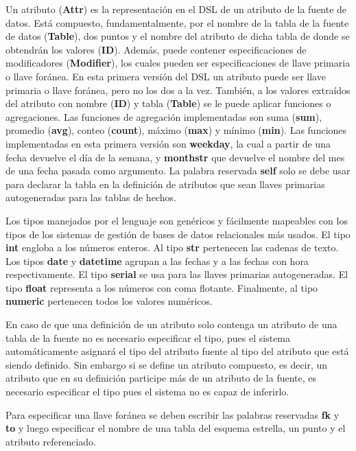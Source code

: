 Un atributo (\textbf{Attr}) es la representación en el DSL de un atributo de la fuente de datos. Est\'a compuesto, 
fundamentalmente, 
por el nombre de la tabla de la fuente de datos (\textbf{Table}), dos puntos y el nombre del atributo de dicha tabla 
de donde se obtendrán los valores (\textbf{ID}). Además, puede contener especificaciones de modificadores (\textbf{Modifier}), 
los cuales pueden ser especificaciones de llave primaria o llave for\'anea. En esta primera versión del 
DSL un atributo puede ser llave primaria o llave for\'anea, pero no los dos a la vez. También, a los valores
extra\'idos del atributo con nombre (\textbf{ID}) y tabla (\textbf{Table}) se le puede aplicar funciones o agregaciones. Las 
funciones de agregación implementadas son suma (\textbf{sum}), promedio (\textbf{avg}), conteo (\textbf{count}), máximo (\textbf{max}) y 
mínimo (\textbf{min}). Las funciones implementadas en esta primera versión son \textbf{weekday}, la cual a partir de 
una fecha devuelve el d\'ia de la semana, y \textbf{monthstr} que devuelve el nombre del mes de una fecha pasada 
como argumento. La palabra reservada \textbf{self} solo se debe usar para declarar la tabla en la definición de atributos 
que sean llaves primarias autogeneradas para las tablas de hechos.

Los tipos manejados por el lenguaje son genéricos y fácilmente mapeables con los tipos de los sistemas de 
gestión de bases de datos relacionales m\'as usados. El tipo \textbf{int} engloba a los n\'umeros enteros. 
Al tipo \textbf{str} pertenecen las cadenas de texto. Los tipos \textbf{date} y \textbf{datetime} agrupan a las fechas y a las fechas con 
hora respectivamente. El tipo \textbf{serial} se usa para las llaves primarias autogeneradas. El tipo \textbf{float} 
representa a los n\'umeros con coma flotante. Finalmente, al tipo \textbf{numeric} pertenecen todos los valores numéricos.

En caso de que una definición de un atributo solo contenga un atributo de una tabla de la fuente no es necesario 
especificar el tipo, pues el sistema automáticamente asignar\'a el tipo del atributo fuente al tipo del 
atributo que est\'a siendo definido. Sin embargo si se define un atributo compuesto, es decir, un atributo que 
en su definición participe m\'as de un atributo de la fuente, es necesario especificar el tipo pues el sistema 
no es capaz de inferirlo.

Para especificar una llave for\'anea se deben escribir las palabras reservadas \textbf{fk} y \textbf{to} y luego especificar 
el nombre de una tabla del esquema estrella, un punto y el atributo referenciado.

